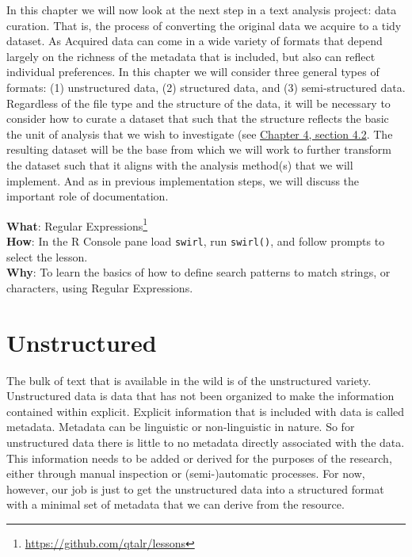 \documentclass[
  letterpaper,
  DIV=11,
  numbers=noendperiod]{scrreport}
\theoremstyle{definition}
\theoremstyle{remark}
\DeclareRobustCommand{\href}[2]{#2\footnote{\url{#1}}}
\begin{document}
In this chapter we will now look at the next step in a text analysis
project: data curation. That is, the process of converting the original
data we acquire to a tidy dataset. As Acquired data can come in a wide
variety of formats that depend largely on the richness of the metadata
that is included, but also can reflect individual preferences. In this
chapter we will consider three general types of formats: (1)
unstructured data, (2) structured data, and (3) semi-structured data.
Regardless of the file type and the structure of the data, it will be
necessary to consider how to curate a dataset that such that the
structure reflects the basic the unit of analysis that we wish to
investigate (see
\protect\hyperlink{sec-framing-research.htmlux5cux23research-question}{Chapter
4, section 4.2}. The resulting dataset will be the base from which we
will work to further transform the dataset such that it aligns with the
analysis method(s) that we will implement. And as in previous
implementation steps, we will discuss the important role of
documentation.

\begin{tcolorbox}[enhanced jigsaw, breakable, arc=.35mm, opacityback=0, bottomrule=.15mm, colback=white, opacitybacktitle=0.6, colframe=quarto-callout-tip-color-frame, toptitle=1mm, colbacktitle=quarto-callout-tip-color!10!white, left=2mm, leftrule=.75mm, toprule=.15mm, title=\textcolor{quarto-callout-tip-color}{\faLightbulb}\hspace{0.5em}{Swirl}, bottomtitle=1mm, coltitle=black, titlerule=0mm, rightrule=.15mm]

\textbf{What}: \href{https://github.com/qtalr/lessons}{Regular
Expressions}\\
\textbf{How}: In the R Console pane load \texttt{swirl}, run
\texttt{swirl()}, and follow prompts to select the lesson.\\
\textbf{Why}: To learn the basics of how to define search patterns to
match strings, or characters, using Regular Expressions.

\end{tcolorbox}

\hypertarget{unstructured}{%
\section{Unstructured}\label{unstructured}}

The bulk of text that is available in the wild is of the unstructured
variety. Unstructured data is data that has not been organized to make
the information contained within explicit. Explicit information that is
included with data is called metadata. Metadata can be linguistic or
non-linguistic in nature. So for unstructured data there is little to no
metadata directly associated with the data. This information needs to be
added or derived for the purposes of the research, either through manual
inspection or (semi-)automatic processes. For now, however, our job is
just to get the unstructured data into a structured format with a
minimal set of metadata that we can derive from the resource.
\end{document}
